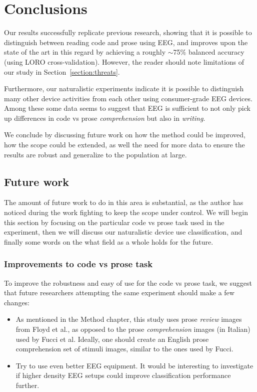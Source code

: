\chapter{Conclusions}

Our results successfully replicate previous research, showing that it is possible to distinguish between reading code and prose using EEG, and improves upon the state of the art in this regard by achieving a roughly $\sim$75\% balanced accuracy (using LORO cross-validation). However, the reader should note limitations of our study in Section~\ref{section:threats}.

Furthermore, our naturalistic experiments indicate it is possible to distinguish many other device activities from each other using consumer-grade EEG devices. Among these some data seems to suggest that EEG is sufficient to not only pick up differences in code vs prose \emph{comprehension} but also in \emph{writing}.

We conclude by discussing future work on how the method could be improved, how the scope could be extended, as well the need for more data to ensure the results are robust and generalize to the population at large.

\section{Future work}

The amount of future work to do in this area is substantial, as the author has noticed during the work fighting to keep the scope under control. We will begin this section by focusing on the particular code vs prose task used in the experiment, then we will discuss our naturalistic device use classification, and finally some words on the what field as a whole holds for the future.

\subsection{Improvements to code vs prose task}

\begin{minipage}{\textwidth}
To improve the robustness and easy of use for the code vs prose task, we suggest that future researchers attempting the same experiment should make a few changes:

\begin{itemize}
    \item As mentioned in the Method chapter, this study uses prose \emph{review} images from Floyd et al., as opposed to the prose \emph{comprehension} images (in Italian) used by Fucci et al. Ideally, one should create an English prose comprehension set of stimuli images, similar to the ones used by Fucci.
    \item Try to use even better EEG equipment. It would be interesting to investigate if higher density EEG setups could improve classification performance further.
\end{itemize}
\end{minipage}

